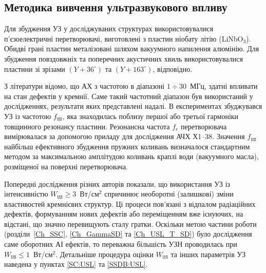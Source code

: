 \subsection{Методика вивчення ультразвукового впливу}

Для збудження УЗ у досліджуваних структурах використовувалися п'єзоелектричні перетворювачі,
виготовлені з пластин ніобату літію (LiNbO$_3$).
Обидві грані пластин металізовані шляхом вакуумного напилення алюмінію.
Для збудження повздовжніх та поперечних акустичних хвиль використовувалися пластини зі зрізами $(Y\!+\!36^\circ)$ та $(Y\!+\!163^\circ)$, відповідно.

З літератури \cite{Ostapenko1995,Davletova2008,Davletova2009,Pashaev2014r} відомо, що АХ з частотою в діапазоні $1\div30$~МГц, здатні впливати на стан дефектів у кремнії.
Саме такий частотний діапазон був використаний у дослідженнях, результати яких представлені надалі.
В експериментах збуджувався УЗ із частотою $f_\mathtt{US}$, яка знаходилась поблизу першої або третьої гармоніки товщинного резонансу пластини.
Резонансна частота $f_r$ перетворювача вимірювалася за допомогою приладу для дослідження АЧХ Х1--38.
Значення $f_\mathtt{US}$ найбільш ефективного збудження пружних коливань визначалося стандартним методом за максимальною амплітудою коливань краплі води (вакуумного масла), розміщеної на поверхні перетворювача.

Попередні дослідження різних авторів \cite{Davletova2008,Davletova2009,Pashaev2014r,Vlasov2009r} показали, що використання УЗ
із інтенсивністю $W_\mathtt{US}\geq3$~Вт/см$^2$ спричинює необоротні (залишкові) зміни властивостей кремнієвих структур.
Ці процеси пов'язані з відпалом радіаційних дефектів, формуванням нових дефектів або переміщенням вже існуючих, на відстані, що значно перевищують сталу гратки.
Оскільки метою частини роботи (розділи~\ref{Ch_SSC}, \ref{Ch_GammaSD} та \ref{Ch_USL_T_SD}) було дослідження саме оборотних АІ ефектів,
то переважна більшість УЗН проводилась при $W_\mathtt{US} \leq 1$~Вт/см$^2$.
Детальніше процедура оцінки $W_\mathtt{US}$ та інших параметрів УЗ наведена у пунктах \ref{SC:USL} та \ref{SSDB:USL}.



